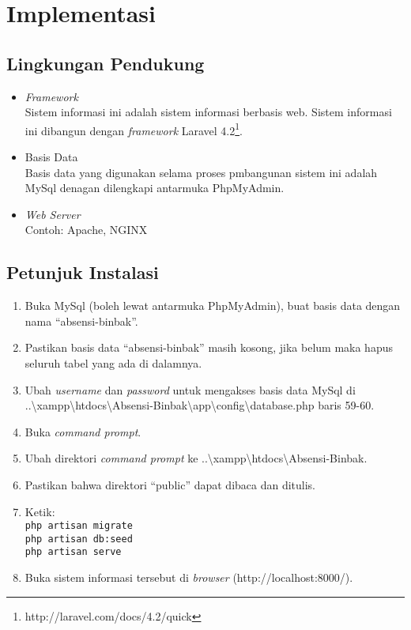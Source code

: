 \section{Implementasi}

\subsection{Lingkungan Pendukung}
\begin{itemize}
	\item \textit{Framework}
\\Sistem informasi ini adalah sistem informasi berbasis web. Sistem informasi ini dibangun dengan \textit{framework} Laravel 4.2\footnote{http://laravel.com/docs/4.2/quick}. 
	\item Basis Data
\\Basis data yang digunakan selama proses pmbangunan sistem ini adalah MySql denagan dilengkapi antarmuka PhpMyAdmin.  
	\item \textit{Web Server} 
\\Contoh: Apache, NGINX
\end{itemize}

\subsection{Petunjuk Instalasi}
\begin{enumerate}
	\item Buka MySql (boleh lewat antarmuka PhpMyAdmin), buat basis data dengan nama ``absensi-binbak''.
	\item Pastikan basis data ``absensi-binbak'' masih kosong, jika belum maka hapus seluruh tabel yang ada di dalamnya.
	\item Ubah \textit{username} dan \textit{password} untuk mengakses basis data MySql di ..\textbackslash xampp\textbackslash htdocs\textbackslash Absensi-Binbak\textbackslash app\textbackslash config\textbackslash database.php baris 59-60.
	\item Buka \textit{command prompt}.
	\item Ubah direktori \textit{command prompt} ke ..\textbackslash xampp\textbackslash htdocs\textbackslash Absensi-Binbak.
	\item Pastikan bahwa direktori ``public'' dapat dibaca dan ditulis.
	\item Ketik: \\\texttt{php artisan migrate}\\\texttt{php artisan db:seed}\\\texttt{php artisan serve}
	\item Buka sistem informasi tersebut di \textit{browser} (http://localhost:8000/).
\end{enumerate}



